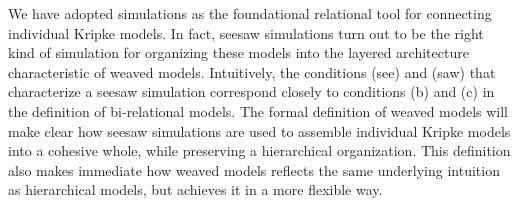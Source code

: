
We have adopted simulations as the foundational relational tool for connecting individual Kripke models. In fact, seesaw simulations turn out to be the right kind of simulation for organizing these models into the layered architecture characteristic of weaved models. Intuitively, the conditions (see) and (saw) that characterize a seesaw simulation correspond closely to conditions (b) and (c) in the definition of bi-relational models. The formal definition of weaved models will make clear how seesaw simulations are used to assemble individual Kripke models into a cohesive whole, while preserving a hierarchical organization. This definition also makes immediate how weaved models reflects the same underlying intuition as hierarchical models, but achieves it in a more flexible way.



